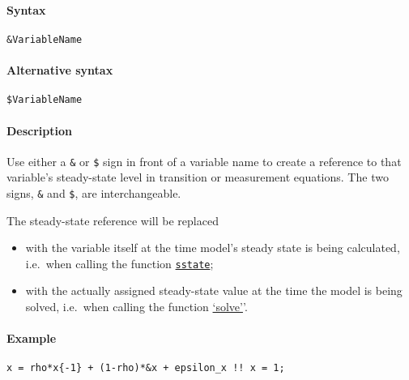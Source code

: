 


	\paragraph{Syntax}

\begin{verbatim}
&VariableName
\end{verbatim}

\paragraph{Alternative syntax}

\begin{verbatim}
$VariableName
\end{verbatim}

\paragraph{Description}

Use either a \texttt{\&} or \texttt{\$} sign in front of a variable name
to create a reference to that variable's steady-state level in
transition or measurement equations. The two signs, \texttt{\&} and
\texttt{\$}, are interchangeable.

The steady-state reference will be replaced

\begin{itemize}
\item
  with the variable itself at the time model's steady state is being
  calculated, i.e.~when calling the function
  \href{model/sstate}{\texttt{sstate}};
\item
  with the actually assigned steady-state value at the time the model is
  being solved, i.e.~when calling the function
  \href{model/solve}{`solve'}'.
\end{itemize}

\paragraph{Example}

\begin{verbatim}
x = rho*x{-1} + (1-rho)*&x + epsilon_x !! x = 1;
\end{verbatim}


